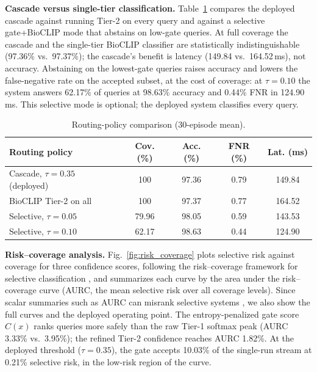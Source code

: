 \documentclass[preprint,12pt]{elsarticle}
\begin{document}
\textbf{Cascade versus single-tier classification.} Table~\ref{tab:gate_scenario} compares the deployed cascade against running Tier-2 on every query and against a selective gate+BioCLIP mode that abstains on low-gate queries. At full coverage the cascade and the single-tier BioCLIP classifier are statistically indistinguishable (97.36\% vs.\ 97.37\%); the cascade's benefit is latency (149.84 vs.\ 164.52\,ms), not accuracy. Abstaining on the lowest-gate queries raises accuracy and lowers the false-negative rate on the accepted subset, at the cost of coverage: at $\tau=0.10$ the system answers 62.17\% of queries at 98.63\% accuracy and 0.44\% FNR in 124.90\,ms. This selective mode is optional; the deployed system classifies every query.

\begin{table}[htbp]
\centering
\caption{Routing-policy comparison (30-episode mean).}
\label{tab:gate_scenario}
\footnotesize
\setlength{\tabcolsep}{3pt}
\begin{tabular*}{\columnwidth}{@{\extracolsep{\fill}}lcccc}
\toprule
\textbf{Routing policy} & \textbf{Cov. (\%)} & \textbf{Acc. (\%)} & \textbf{FNR (\%)} & \textbf{Lat. (ms)} \\
\midrule
Cascade, $\tau=0.35$ (deployed) & 100 & 97.36 & 0.79 & 149.84 \\
BioCLIP Tier-2 on all & 100 & 97.37 & 0.77 & 164.52 \\
Selective, $\tau=0.05$ & 79.96 & 98.05 & 0.59 & 143.53 \\
Selective, $\tau=0.10$ & 62.17 & 98.63 & 0.44 & 124.90 \\
\bottomrule
\end{tabular*}
\end{table}

\textbf{Risk--coverage analysis.} Fig.~\ref{fig:risk_coverage} plots selective risk against coverage for three confidence scores, following the risk--coverage framework for selective classification \cite{geifman2017selective}, and summarizes each curve by the area under the risk--coverage curve (AURC, the mean selective risk over all coverage levels). Since scalar summaries such as AURC can misrank selective systems \cite{traub2024overcoming}, we also show the full curves and the deployed operating point. The entropy-penalized gate score $C(x)$ ranks queries more safely than the raw Tier-1 softmax peak (AURC 3.33\% vs.\ 3.95\%); the refined Tier-2 confidence reaches AURC 1.82\%. At the deployed threshold ($\tau=0.35$), the gate accepts 10.03\% of the single-run stream at 0.21\% selective risk, in the low-risk region of the curve.
\end{document}
